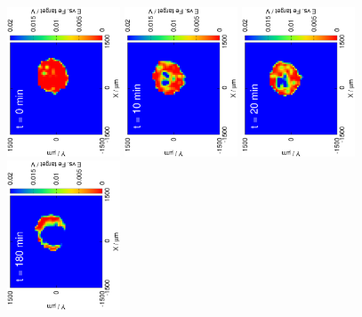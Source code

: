 \documentclass[3p]{elsarticle}
\begin{document}
\begin{figure}[H]
\centering
\includegraphics[trim = 15mm 30mm 0mm 15mm, clip, width=0.3\textwidth, angle=-90]{17052401.eps} 
\includegraphics[trim = 15mm 30mm 0mm 15mm, clip, width=0.3\textwidth, angle=-90]{17052402.eps}
\includegraphics[trim = 15mm 30mm 0mm 15mm, clip, width=0.3\textwidth, angle=-90]{17052403.eps} 
\includegraphics[trim = 15mm 30mm 0mm 15mm, clip, width=0.3\textwidth, angle=-90]{17052405.eps}


\end{figure}
\end{document}
